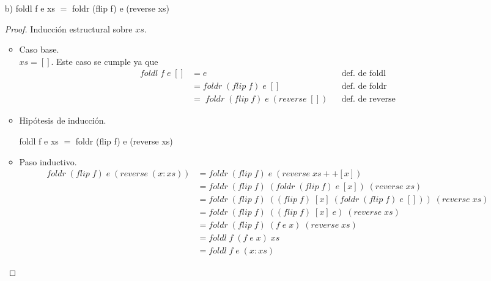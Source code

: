 \documentclass[letterpaper,11pt]{article}
\begin{document}
\begin{enumerate}
\begin{itemize}
        \item[b)] foldl f e xs $=$ foldr (flip f) e (reverse xs)
        \begin{proof}
            Inducción estructural sobre $xs$.
            \begin{itemize}
                \item Caso base. \\ 
                $xs = []$. Este caso se cumple ya que
                \begin{align*}
                    foldl \; f \; e \; []
                    &= e
                    && \text{def. de foldl} \\ 
                    &= foldr \; (flip \; f) \; e \; []
                    && \text{def. de foldr} \\ 
                    &= \; foldr \; (flip \; f) \; e \; (reverse \; [])
                    && \text{def. de reverse}
                \end{align*}

                \item Hipótesis de inducción.
                \begin{center}
                    foldl f e xs $=$ foldr (flip f) e (reverse xs)
                \end{center}
                
                \item Paso inductivo.
                \begin{align*}
                    foldr \; (flip \; f) \; e \; (reverse \; (x:xs))
                    &= foldr \; (flip \; f) \; e \; (reverse \; xs ++ [x]) \\ 
                    &= foldr \; (flip \; f) \; (foldr \; (flip \; f) \; e \; [x]) \; (reverse \; xs) \\ 
                    &= foldr \; (flip \; f) \; ((flip \; f) \; [x] \; (foldr \; (flip \; f) \; e \; [])) \; (reverse \; xs) \\ 
                    &= foldr \; (flip \; f) \; ((flip \; f) \; [x] \; e) \; (reverse \; xs) \\
                    &= foldr \; (flip \; f) \; (f \; e \; x) \; (reverse \; xs) \\ 
                    &= foldl \; f \; (f \; e \; x) \; xs \\ 
                    &= foldl \; f \; e \; (x:xs)
                \end{align*}


\end{itemize}
\end{proof}
\end{itemize}
\end{enumerate}
\end{document}
